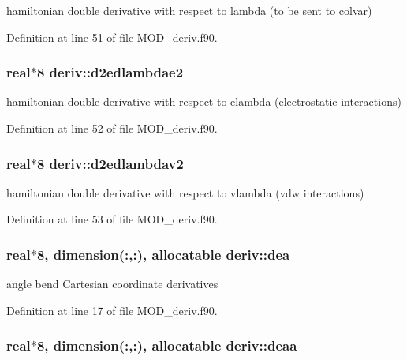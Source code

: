 hamiltonian double derivative with respect to lambda (to be sent to colvar) 



Definition at line 51 of file M\-O\-D\-\_\-deriv.\-f90.

\hypertarget{classderiv_ade349a1c2864830e3ed301aa15f22b1e}{
\subsubsection[{d2edlambdae2}]{\setlength{\rightskip}{0pt plus 5cm}real$\ast$8 deriv\-::d2edlambdae2}}\label{classderiv_ade349a1c2864830e3ed301aa15f22b1e}


hamiltonian double derivative with respect to elambda (electrostatic interactions) 



Definition at line 52 of file M\-O\-D\-\_\-deriv.\-f90.

\hypertarget{classderiv_aa177d2f37dcb5778b286ddf812d2c3bc}{
\subsubsection[{d2edlambdav2}]{\setlength{\rightskip}{0pt plus 5cm}real$\ast$8 deriv\-::d2edlambdav2}}\label{classderiv_aa177d2f37dcb5778b286ddf812d2c3bc}


hamiltonian double derivative with respect to vlambda (vdw interactions) 



Definition at line 53 of file M\-O\-D\-\_\-deriv.\-f90.

\hypertarget{classderiv_af26650de96064a2ee29f2892416d4994}{
\subsubsection[{dea}]{\setlength{\rightskip}{0pt plus 5cm}real$\ast$8, dimension(\-:,\-:), allocatable deriv\-::dea}}\label{classderiv_af26650de96064a2ee29f2892416d4994}


angle bend Cartesian coordinate derivatives 



Definition at line 17 of file M\-O\-D\-\_\-deriv.\-f90.

\hypertarget{classderiv_a179dc2259c330cf6181548c2d2ceee83}{
\subsubsection[{deaa}]{\setlength{\rightskip}{0pt plus 5cm}real$\ast$8, dimension(\-:,\-:), allocatable deriv\-::deaa}}\label{classderiv_a179dc2259c330cf6181548c2d2ceee83}


